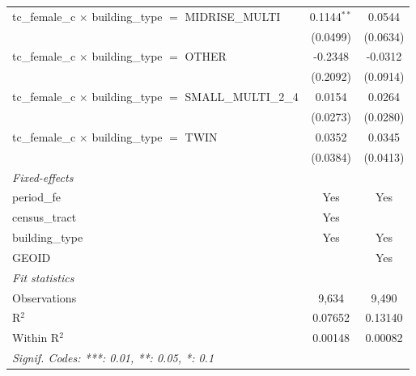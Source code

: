 \begin{tabular}{lcc}
   tc\_female\_c $\times$ building\_type $=$ MIDRISE\_MULTI            & 0.1144$^{**}$  & 0.0544\\   
                                                                       & (0.0499)       & (0.0634)\\   
   tc\_female\_c $\times$ building\_type $=$ OTHER                     & -0.2348        & -0.0312\\   
                                                                       & (0.2092)       & (0.0914)\\   
   tc\_female\_c $\times$ building\_type $=$ SMALL\_MULTI\_2\_4        & 0.0154         & 0.0264\\   
                                                                       & (0.0273)       & (0.0280)\\   
   tc\_female\_c $\times$ building\_type $=$ TWIN                      & 0.0352         & 0.0345\\   
                                                                       & (0.0384)       & (0.0413)\\   
   \midrule
   \emph{Fixed-effects}\\
   period\_fe                                                          & Yes            & Yes\\  
   census\_tract                                                       & Yes            & \\  
   building\_type                                                      & Yes            & Yes\\  
   GEOID                                                               &                & Yes\\  
   \midrule
   \emph{Fit statistics}\\
   Observations                                                        & 9,634          & 9,490\\  
   R$^2$                                                               & 0.07652        & 0.13140\\  
   Within R$^2$                                                        & 0.00148        & 0.00082\\  
   \midrule \midrule
   \multicolumn{3}{l}{\emph{Signif. Codes: ***: 0.01, **: 0.05, *: 0.1}}\\
\end{tabular}
\par\endgroup
\begingroup
\centering
